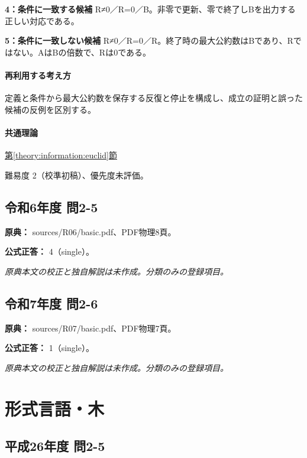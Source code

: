 \noindent\textbf{4：条件に一致する候補} R≠0／R=\allowbreak{}0／B。非零で更新、零で終了しBを出力する正しい対応である。\par

\noindent\textbf{5：条件に一致しない候補} R≠0／R=\allowbreak{}0／R。終了時の最大公約数はBであり、Rではない。AはBの倍数で、Rは0である。\par

\paragraph{再利用する考え方} 定義と条件から最大公約数を保存する反復と停止を構成し、成立の証明と誤った候補の反例を区別する。

\paragraph{共通理論} \hyperref[theory:information:euclid]{第\ref*{theory:information:euclid}節}

\par 難易度 2（校準初稿）、優先度未評価。

\subsection{令和6年度 問2-5}
\label{q:r06-reg-basic-2-5}

\noindent\textbf{原典：} sources/R06/basic.pdf、PDF物理8頁。

\textbf{公式正答：} 4（single）。

\par\textit{原典本文の校正と独自解説は未作成。分類のみの登録項目。}

\subsection{令和7年度 問2-6}
\label{q:r07-reg-basic-2-6}

\noindent\textbf{原典：} sources/R07/basic.pdf、PDF物理7頁。

\textbf{公式正答：} 1（single）。

\par\textit{原典本文の校正と独自解説は未作成。分類のみの登録項目。}

\section{形式言語・木}

\subsection{平成26年度 問2-5}
\label{q:h26-reg-basic-2-5}

